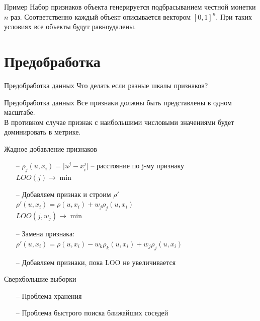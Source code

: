 \documentclass[10pt]{beamer}
\begin{document}
\begin{frame}{Пример}
	Набор признаков объекта генерируется подбрасыванием честной монетки $n$ раз. Соответственно
	каждый объект описывается вектором $[0, 1]^n$. При таких условиях все объекты будут равноудалены.
\end{frame}

\section{Предобработка}

\begin{frame}{Предобработка данных}
	\centering
	Что делать если разные шкалы признаков?
\end{frame}

\begin{frame}{Предобработка данных}
	Все признаки должны быть представлены \alert{в одном масштабе}. \\
	В противном случае признак с наибольшими числовыми значениями будет доминировать в метрике.
\end{frame}


\begin{frame}{Жадное добавление признаков}
	\begin{itemize} [<+- | alert@+>]
		\item[--] ${\rho_j(u, x_i) = \vert u^j - x_i^j \vert}$ -- расстояние по j-му признаку\\
		          $LOO(j) \rightarrow \min$\\
		\item[--] Добавляем признак и строим $\rho'$\\
							${\rho'(u, x_i) = \rho(u, x_i) + w_j\rho_j(u, x_i)}$\\
							$LOO(j, w_j) \rightarrow \min$\\
		\item[--] Замена признака:\\
            		${\rho'(u, x_i) = \rho(u, x_i) - w_k\rho_k(u, x_i) + w_j\rho_j(u, x_i)}$\\
		\item[--] Добавляем признаки, пока LOO не увеличивается
	\end{itemize}
\end{frame}

\begin{frame}{Сверхбольшие выборки}
	\begin{itemize} [<+- | alert@+>]
		\item[--] Проблема хранения
		\item[--] Проблема быстрого поиска ближайших соседей
	\end{itemize}
\end{frame}
\end{document}
